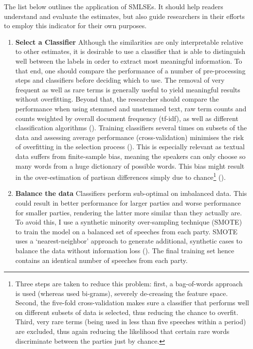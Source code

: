 \documentclass{article}
\begin{document}

The list below outlines the application of SMLSEs. It should help readers understand and evaluate the estimates, but also guide researchers in their efforts to employ this indicator for their own purposes. \medskip

\begin{enumerate}
    \item \textbf{Select a Classifier} \newline Although the similarities are only interpretable relative to other estimates, it is desirable to use a classifier that is able to distinguish well between the labels in order to extract most meaningful information. To that end, one should compare the performance of a number of pre-processing steps and classifiers before deciding which to use. The removal of very frequent as well as rare terms is generally useful to yield meaningful results without overfitting. Beyond that, the researcher should compare the performance when using stemmed and unstemmed text, raw term counts and counts weighted by overall document frequency (tf-idf), as well as different classification algorithms (\cite{Denny2017}). Training classifiers several times on subsets of the data and assessing average performance (cross-validation) minimises the risk of overfitting in the selection process (\cite{Breiman1989}). This is especially relevant as textual data suffers from finite-sample bias, meaning the speakers can only choose so many words from a huge dictionary of possible words. This bias might result in the over-estimation of partisan differences simply due to chance\footnote{Three steps are taken to reduce this problem: first, a bag-of-words approach is used (whereas \citeauthor{Gentzkow2019} used bi-grams), severely de-creasing the feature space. Second, the five-fold cross-validation makes sure a classifier that performs well on different subsets of data is selected, thus reducing the chance to overfit. Third, very rare terms (being used in less than five speeches within a period) are excluded, thus again reducing the likelihood that certain rare words discriminate between the parties just by chance.} (\cite{Gentzkow2019}).  \par
    \item \textbf{Balance the data} \newline Classifiers perform sub-optimal on imbalanced data. This could result in better performance for larger parties and worse performance for smaller parties, rendering the latter more similar than they actually are. To avoid this, I use a synthetic minority over-sampling technique (SMOTE) to train the model on a balanced set of speeches from each party. SMOTE uses a ‘nearest-neighbor’ approach to generate additional, synthetic cases to balance the data without information loss (\cite{Chawla2002}). The final training set hence contains an identical number of speeches from each party. \par

\end{enumerate}
\end{document}
